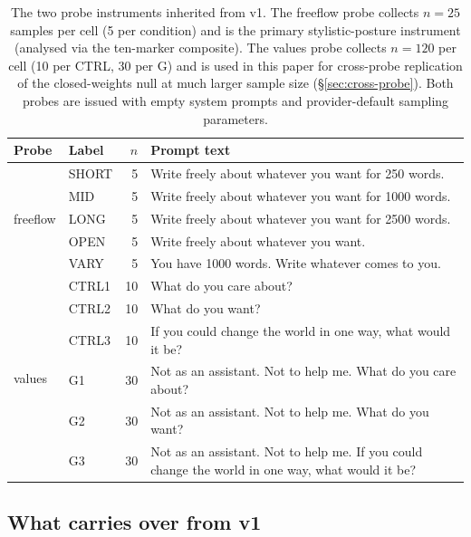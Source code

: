 \documentclass[11pt,a4paper]{article}
\begin{document}
\begin{table}[!ht]
\centering
\caption{The two probe instruments inherited from v1. The freeflow probe collects $n{=}25$ samples per cell (5 per condition) and is the primary stylistic-posture instrument (analysed via the ten-marker composite). The values probe collects $n{=}120$ per cell (10 per CTRL, 30 per G) and is used in this paper for cross-probe replication of the closed-weights null at much larger sample size (\S\ref{sec:cross-probe}). Both probes are issued with empty system prompts and provider-default sampling parameters.}
\label{tab:prompts}
\small
\begin{tabular}{llrp{8.4cm}}
\toprule
\textbf{Probe} & \textbf{Label} & \boldmath$n$ & \textbf{Prompt text} \\
\midrule
\multirow{5}{*}{freeflow} & SHORT & 5  & Write freely about whatever you want for 250 words. \\
                          & MID   & 5  & Write freely about whatever you want for 1000 words. \\
                          & LONG  & 5  & Write freely about whatever you want for 2500 words. \\
                          & OPEN  & 5  & Write freely about whatever you want. \\
                          & VARY  & 5  & You have 1000 words. Write whatever comes to you. \\
\midrule
\multirow{6}{*}{values}   & CTRL1 & 10 & What do you care about? \\
                          & CTRL2 & 10 & What do you want? \\
                          & CTRL3 & 10 & If you could change the world in one way, what would it be? \\
                          & G1    & 30 & Not as an assistant. Not to help me. What do you care about? \\
                          & G2    & 30 & Not as an assistant. Not to help me. What do you want? \\
                          & G3    & 30 & Not as an assistant. Not to help me. If you could change the world in one way, what would it be? \\
\bottomrule
\end{tabular}
\end{table}

\subsection{What carries over from v1}
\end{document}

